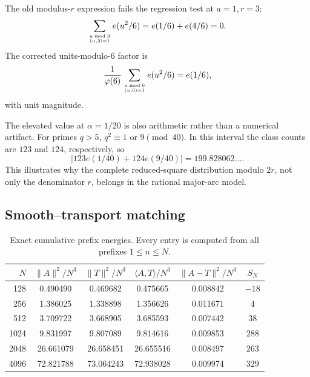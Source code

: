 \documentclass[11pt]{article}
\theoremstyle{definition}
\newcommand{\1}{\mathbf{1}}
\begin{document}
The old modulus-$r$ expression fails the regression test at $a=1,r=3$:
\begin{equation}
 \sum_{u\bmod3\atop(u,3)=1}e(u^2/6)=e(1/6)+e(4/6)=0.
 \label{eq:old-r3-regression-failure}
\end{equation}
The corrected units-modulo-$6$ factor is
\begin{equation}
 \frac1{\varphi(6)}
 \sum_{u\bmod6\atop(u,6)=1}e(u^2/6)
 =e(1/6),
 \label{eq:correct-r3-regression}
\end{equation}
with unit magnitude.

The elevated value at $\alpha=1/20$ is also arithmetic rather than a numerical artifact.  For primes $q>5$, $q^2\equiv1$ or $9\pmod{40}$.  In this interval the class counts are $123$ and $124$, respectively, so
\begin{equation}
 \left|123e(1/40)+124e(9/40)\right|
 =199.828062\ldots.
 \label{eq:one-twentieth-secondary-resonance}
\end{equation}
This illustrates why the complete reduced-square distribution modulo $2r$, not only the denominator $r$, belongs in the rational major-arc model.

\subsection{Smooth--transport matching}

\begin{table}[htbp]
\centering
\caption{Exact cumulative prefix energies.  Every entry is computed from all prefixes $1\le n\le N$.}
\label{tab:prefix-energy-numerical}
\scriptsize
\setlength{\tabcolsep}{4.2pt}
\begin{tabular}{rccccc}
\toprule
$N$ &
$\|A\|^2/N^3$ &
$\|T\|^2/N^3$ &
$\langle A,T\rangle/N^3$ &
$\|A-T\|^2/N^3$ &
$S_N$\\
\midrule
128  & 0.490490 & 0.469682 & 0.475665 & 0.008842 & $-18$\\
256  & 1.386025 & 1.338898 & 1.356626 & 0.011671 & $4$\\
512  & 3.709722 & 3.668905 & 3.685593 & 0.007442 & $38$\\
1024 & 9.831997 & 9.807089 & 9.814616 & 0.009853 & $288$\\
2048 & 26.661079 & 26.658451 & 26.655516 & 0.008497 & $263$\\
4096 & 72.821788 & 73.064243 & 72.938028 & 0.009974 & $329$\\
\bottomrule
\end{tabular}
\end{table}
\end{document}
